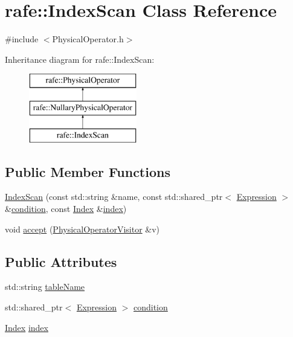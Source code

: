 \hypertarget{classrafe_1_1_index_scan}{\section{rafe\+:\+:Index\+Scan Class Reference}
\label{classrafe_1_1_index_scan}
}


{\ttfamily \#include $<$Physical\+Operator.\+h$>$}

Inheritance diagram for rafe\+:\+:Index\+Scan\+:\begin{figure}[H]
\begin{center}
\leavevmode
\includegraphics[height=3.000000cm]{classrafe_1_1_index_scan}
\end{center}
\end{figure}
\subsection*{Public Member Functions}
\begin{DoxyCompactItemize}
\item 
\hyperlink{classrafe_1_1_index_scan_acda9bef1fc1996fa1a51dd4965c902c1}{Index\+Scan} (const std\+::string \&name, const std\+::shared\+\_\+ptr$<$ \hyperlink{classrafe_1_1_expression}{Expression} $>$ \&\hyperlink{classrafe_1_1_index_scan_a3ea0ae237e08c4a601529929f6d80052}{condition}, const \hyperlink{classrafe_1_1_index}{Index} \&\hyperlink{classrafe_1_1_index_scan_a95bd35c11302e772572cb37df93cc3a7}{index})
\item 
void \hyperlink{classrafe_1_1_index_scan_a5e4e26317258097176b3b3b241653302}{accept} (\hyperlink{classrafe_1_1_physical_operator_visitor}{Physical\+Operator\+Visitor} \&v)
\end{DoxyCompactItemize}
\subsection*{Public Attributes}
\begin{DoxyCompactItemize}
\item 
std\+::string \hyperlink{classrafe_1_1_index_scan_a10d1f881994a96dee8e9e29f367626e9}{table\+Name}
\item 
std\+::shared\+\_\+ptr$<$ \hyperlink{classrafe_1_1_expression}{Expression} $>$ \hyperlink{classrafe_1_1_index_scan_a3ea0ae237e08c4a601529929f6d80052}{condition}
\item 
\hyperlink{classrafe_1_1_index}{Index} \hyperlink{classrafe_1_1_index_scan_a95bd35c11302e772572cb37df93cc3a7}{index}
\end{DoxyCompactItemize}


